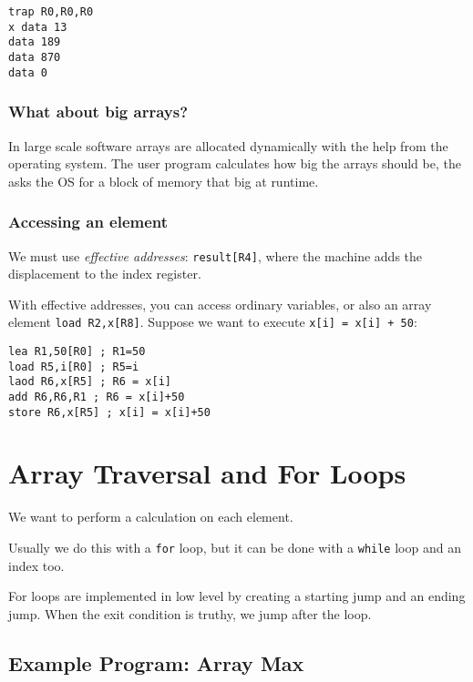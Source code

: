 \begin{verbatim}
trap R0,R0,R0
x data 13
data 189
data 870
data 0
\end{verbatim}

\subsubsection{What about big arrays?}\label{ssub:what_about_big_arrays}

In large scale software arrays are allocated dynamically with the help from the operating system.
The user program calculates how big the arrays should be, the asks the OS for a block of memory that big at runtime.

\subsubsection{Accessing an element}\label{ssub:accessing_an_element}

We must use \emph{effective addresses}: \texttt{result[R4]}, where the machine adds the displacement to the index register.

With effective addresses, you can access ordinary variables, or also an array element \texttt{load R2,x[R8]}.
Suppose we want to execute \texttt{x[i] = x[i] + 50}:
\begin{verbatim}
lea R1,50[R0] ; R1=50
load R5,i[R0] ; R5=i
laod R6,x[R5] ; R6 = x[i]
add R6,R6,R1 ; R6 = x[i]+50
store R6,x[R5] ; x[i] = x[i]+50
\end{verbatim}

\section{Array Traversal and For Loops}\label{sec:array_traversal_and_for_loops}

We want to perform a calculation on each element.

Usually we do this with a \texttt{for} loop, but it can be done with a \texttt{while} loop and an index too.

For loops are implemented in low level by creating a starting jump and an ending jump.
When the exit condition is truthy, we jump after the loop.

\subsection{Example Program: Array Max}\label{sub:example_program_array_max}

